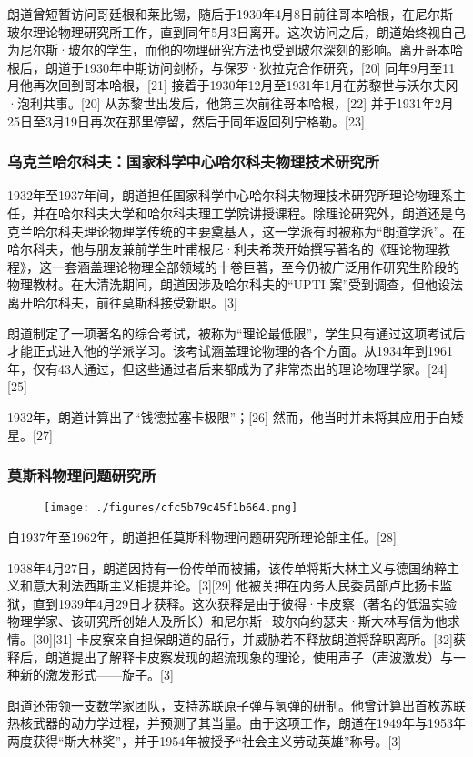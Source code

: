 朗道曾短暂访问哥廷根和莱比锡，随后于1930年4月8日前往哥本哈根，在尼尔斯·玻尔理论物理研究所工作，直到同年5月3日离开。这次访问之后，朗道始终视自己为尼尔斯·玻尔的学生，而他的物理研究方法也受到玻尔深刻的影响。离开哥本哈根后，朗道于1930年中期访问剑桥，与保罗·狄拉克合作研究，[20] 同年9月至11月他再次回到哥本哈根，[21] 接着于1930年12月至1931年1月在苏黎世与沃尔夫冈·泡利共事。[20] 从苏黎世出发后，他第三次前往哥本哈根，[22] 并于1931年2月25日至3月19日再次在那里停留，然后于同年返回列宁格勒。[23]
\subsubsection{乌克兰哈尔科夫：国家科学中心哈尔科夫物理技术研究所}
1932年至1937年间，朗道担任国家科学中心哈尔科夫物理技术研究所理论物理系主任，并在哈尔科夫大学和哈尔科夫理工学院讲授课程。除理论研究外，朗道还是乌克兰哈尔科夫理论物理学传统的主要奠基人，这一学派有时被称为“朗道学派”。在哈尔科夫，他与朋友兼前学生叶甫根尼·利夫希茨开始撰写著名的《理论物理教程》，这一套涵盖理论物理全部领域的十卷巨著，至今仍被广泛用作研究生阶段的物理教材。在大清洗期间，朗道因涉及哈尔科夫的“UPTI 案”受到调查，但他设法离开哈尔科夫，前往莫斯科接受新职。[3]

朗道制定了一项著名的综合考试，被称为“理论最低限”，学生只有通过这项考试后才能正式进入他的学派学习。该考试涵盖理论物理的各个方面。从1934年到1961年，仅有43人通过，但这些通过者后来都成为了非常杰出的理论物理学家。[24][25]

1932年，朗道计算出了“钱德拉塞卡极限”；[26] 然而，他当时并未将其应用于白矮星。[27]
\subsubsection{莫斯科物理问题研究所}
\begin{figure}[ht]
\centering
\texttt{[image: ./figures/cfc5b79c45f1b664.png]}
\caption{} \label{fig_LFLD_3}
\end{figure}
自1937年至1962年，朗道担任莫斯科物理问题研究所理论部主任。[28]

1938年4月27日，朗道因持有一份传单而被捕，该传单将斯大林主义与德国纳粹主义和意大利法西斯主义相提并论。[3][29] 他被关押在内务人民委员部卢比扬卡监狱，直到1939年4月29日才获释。这次获释是由于彼得·卡皮察（著名的低温实验物理学家、该研究所创始人及所长）和尼尔斯·玻尔向约瑟夫·斯大林写信为他求情。[30][31] 卡皮察亲自担保朗道的品行，并威胁若不释放朗道将辞职离所。[32]获释后，朗道提出了解释卡皮察发现的超流现象的理论，使用声子（声波激发）与一种新的激发形式——旋子。[3]

朗道还带领一支数学家团队，支持苏联原子弹与氢弹的研制。他曾计算出首枚苏联热核武器的动力学过程，并预测了其当量。由于这项工作，朗道在1949年与1953年两度获得“斯大林奖”，并于1954年被授予“社会主义劳动英雄”称号。[3]

